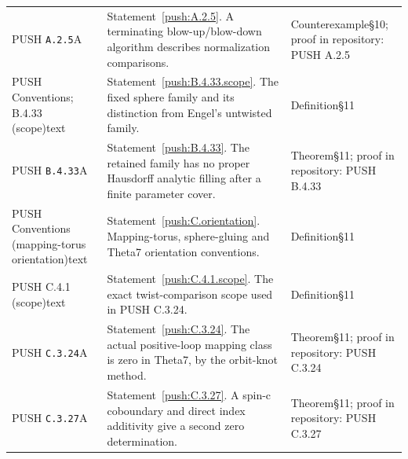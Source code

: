 \documentclass[11pt,a4paper]{article}
\theoremstyle{plain}
\theoremstyle{definition}
\begin{document}
\begin{longtable}{@{}L{.18\linewidth}L{.48\linewidth}L{.29\linewidth}@{}}
PUSH \nolinkurl{A.2.5}\newline A & Statement~\ref{push:A.2.5}. A terminating blow-up/\allowbreak{}blow-down algorithm describes normalization comparisons.\newline {} & Counterexample\newline §10; proof in repository:\allowbreak{} PUSH A.2.5\\
PUSH Conventions; B.4.33 (scope)\newline text & Statement~\ref{push:B.4.33.scope}. The fixed sphere family and its distinction from Engel's untwisted family.\newline {} & Definition\newline §11\\
PUSH \nolinkurl{B.4.33}\newline A & Statement~\ref{push:B.4.33}. The retained family has no proper Hausdorff analytic filling after a finite parameter cover.\newline {} & Theorem\newline §11; proof in repository:\allowbreak{} PUSH B.4.33\\
PUSH Conventions (mapping-torus orientation)\newline text & Statement~\ref{push:C.orientation}. Mapping-torus, sphere-gluing and Theta7 orientation conventions.\newline {} & Definition\newline §11\\
PUSH C.4.1 (scope)\newline text & Statement~\ref{push:C.4.1.scope}. The exact twist-comparison scope used in PUSH C.3.24.\newline {} & Definition\newline §11\\
PUSH \nolinkurl{C.3.24}\newline A & Statement~\ref{push:C.3.24}. The actual positive-loop mapping class is zero in Theta7, by the orbit-knot method.\newline {} & Theorem\newline §11; proof in repository:\allowbreak{} PUSH C.3.24\\
PUSH \nolinkurl{C.3.27}\newline A & Statement~\ref{push:C.3.27}. A spin-c coboundary and direct index additivity give a second zero determination.\newline {} & Theorem\newline §11; proof in repository:\allowbreak{} PUSH C.3.27\\

\end{longtable}
\end{document}
